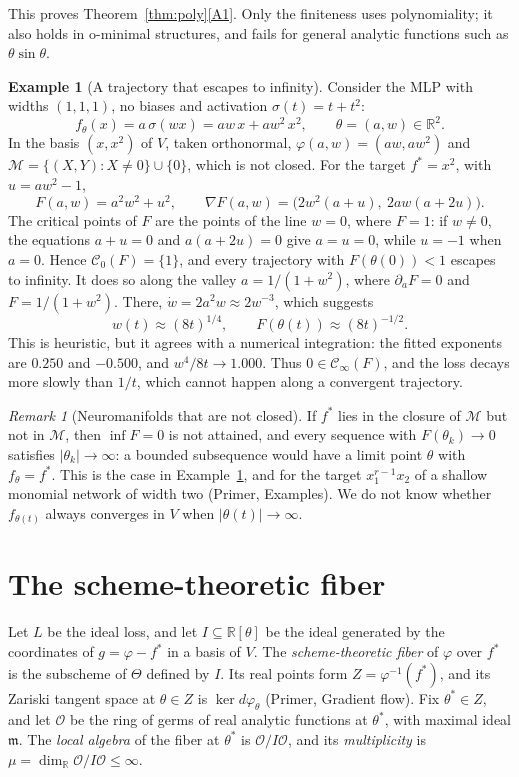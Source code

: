 \documentclass[11pt]{article}
\theoremstyle{definition}
\newtheorem{example}[lemma]{Example}
\theoremstyle{remark}
\newtheorem{remark}[lemma]{Remark}
\newcommand{\R}{\mathbb{R}}
\newcommand{\M}{\mathcal{M}}
\newcommand{\cO}{\mathcal{O}}
\newcommand{\cC}{\mathcal{C}}
\newcommand{\fm}{\mathfrak{m}}
\begin{document}
This proves Theorem~\ref{thm:poly}\ref{A1}. Only the finiteness uses polynomiality; it also holds in o-minimal structures, and fails for general analytic functions such as $\theta\sin\theta$.

\begin{example}[A trajectory that escapes to infinity]\label{ex:divergence}
Consider the MLP with widths $(1,1,1)$, no biases and activation $\sigma(t)=t+t^2$:
\[
f_\theta(x)=a\,\sigma(wx)=aw\,x+aw^2\,x^2,\qquad\theta=(a,w)\in\R^2 .
\]
In the basis $(x,x^2)$ of $V$, taken orthonormal, $\varphi(a,w)=(aw,aw^2)$ and $\M=\{(X,Y):X\ne0\}\cup\{0\}$, which is not closed. For the target $f^*=x^2$, with $u=aw^2-1$,
\[
F(a,w)=a^2w^2+u^2,\qquad\nabla F(a,w)=\big(2w^2(a+u),\ 2aw(a+2u)\big).
\]
The critical points of $F$ are the points of the line $w=0$, where $F=1$: if $w\ne0$, the equations $a+u=0$ and $a(a+2u)=0$ give $a=u=0$, while $u=-1$ when $a=0$. Hence $\cC_0(F)=\{1\}$, and every trajectory with $F(\theta(0))<1$ escapes to infinity. It does so along the valley $a=1/(1+w^2)$, where $\partial_aF=0$ and $F=1/(1+w^2)$. There, $\dot w=2a^2w\approx2w^{-3}$, which suggests
\[
w(t)\approx(8t)^{1/4},\qquad F(\theta(t))\approx(8t)^{-1/2}.
\]
This is heuristic, but it agrees with a numerical integration: the fitted exponents are $0.250$ and $-0.500$, and $w^4/8t\to1.000$. Thus $0\in\cC_\infty(F)$, and the loss decays more slowly than $1/t$, which cannot happen along a convergent trajectory.
\end{example}

\begin{remark}[Neuromanifolds that are not closed]\label{rem:closed}
If $f^*$ lies in the closure of $\M$ but not in $\M$, then $\inf F=0$ is not attained, and every sequence with $F(\theta_k)\to0$ satisfies $|\theta_k|\to\infty$: a bounded subsequence would have a limit point $\theta$ with $f_\theta=f^*$. This is the case in Example~\ref{ex:divergence}, and for the target $x_1^{r-1}x_2$ of a shallow monomial network of width two (Primer, Examples). We do not know whether $f_{\theta(t)}$ always converges in $V$ when $|\theta(t)|\to\infty$.
\end{remark}

\section{The scheme-theoretic fiber}\label{sec:fiber}

Let $L$ be the ideal loss, and let $I\subseteq\R[\theta]$ be the ideal generated by the coordinates of $g=\varphi-f^*$ in a basis of $V$. The \emph{scheme-theoretic fiber} of $\varphi$ over $f^*$ is the subscheme of $\Theta$ defined by $I$. Its real points form $Z=\varphi^{-1}(f^*)$, and its Zariski tangent space at $\theta\in Z$ is $\ker d\varphi_\theta$ (Primer, Gradient flow). Fix $\theta^*\in Z$, and let $\cO$ be the ring of germs of real analytic functions at $\theta^*$, with maximal ideal $\fm$. The \emph{local algebra} of the fiber at $\theta^*$ is $\cO/I\cO$, and its \emph{multiplicity} is $\mu=\dim_\R\cO/I\cO\le\infty$.
\end{document}
